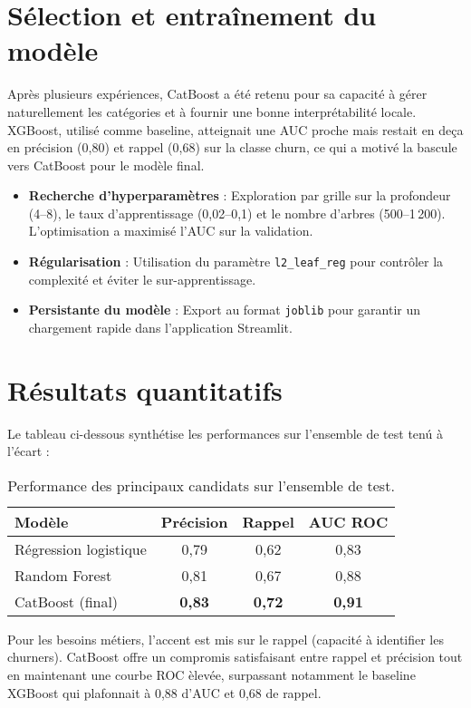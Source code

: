 \section{S\'election et entra\^inement du mod\`ele}
Apr\`es plusieurs exp\'eriences, CatBoost a \'et\'e retenu pour sa capacit\'e \`a g\'erer naturellement les cat\'egories et \`a fournir une bonne interpr\'etabilit\'e locale. XGBoost, utilis\'e comme baseline, atteignait une AUC proche mais restait en de\c{c}a en pr\'ecision (0{,}80) et rappel (0{,}68) sur la classe churn, ce qui a motiv\'e la bascule vers CatBoost pour le mod\`ele final.
\begin{itemize}
    \item \textbf{Recherche d'hyperparam\`etres} : Exploration par grille sur la profondeur (4--8), le taux d'apprentissage (0,02--0,1) et le nombre d'arbres (500--1\,200). L'optimisation a maximis\'e l'AUC sur la validation.
    \item \textbf{R\'egularisation} : Utilisation du param\`etre \texttt{l2\_leaf\_reg} pour contr\^oler la complexit\'e et \'eviter le sur-apprentissage.
    \item \textbf{Persistante du mod\`ele} : Export au format \texttt{joblib} pour garantir un chargement rapide dans l'application Streamlit.
\end{itemize}

\section{R\'esultats quantitatifs}
Le tableau ci-dessous synth\'etise les performances sur l'ensemble de test ten\'u \`a l'\'ecart :
\begin{table}[H]
    \centering
    \begin{tabular}{lccc}
        \toprule
        \textbf{Mod\`ele} & \textbf{Pr\'ecision} & \textbf{Rappel} & \textbf{AUC ROC} \\
        \midrule
        R\'egression logistique & 0{,}79 & 0{,}62 & 0{,}83 \\
        Random Forest & 0{,}81 & 0{,}67 & 0{,}88 \\
        CatBoost (final) & \textbf{0{,}83} & \textbf{0{,}72} & \textbf{0{,}91} \\
        \bottomrule
    \end{tabular}
    \caption{Performance des principaux candidats sur l'ensemble de test.}
    \label{tab:model_performance}
\end{table}

Pour les besoins m\'etiers, l'accent est mis sur le rappel (capacit\'e \`a identifier les churners). CatBoost offre un compromis satisfaisant entre rappel et pr\'ecision tout en maintenant une courbe ROC \`elev\'ee, surpassant notamment le baseline XGBoost qui plafonnait \`a 0{,}88 d'AUC et 0{,}68 de rappel.

